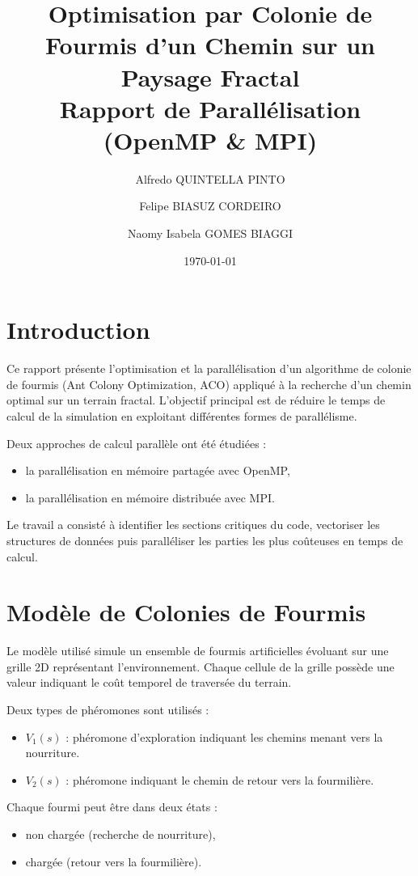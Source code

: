 \documentclass[12pt, a4paper]{article}
\title{\textbf{Optimisation par Colonie de Fourmis d'un Chemin sur un Paysage Fractal} \\ \Large Rapport de Parallélisation (OpenMP \& MPI)}
\author{
    Alfredo QUINTELLA PINTO
    \and
    Felipe BIASUZ CORDEIRO
    \and
    Naomy Isabela GOMES BIAGGI}
\date{\today}
\begin{document}
\maketitle

\section{Introduction}

Ce rapport présente l’optimisation et la parallélisation d’un algorithme de colonie de fourmis (Ant Colony Optimization, ACO) appliqué à la recherche d’un chemin optimal sur un terrain fractal. L’objectif principal est de réduire le temps de calcul de la simulation en exploitant différentes formes de parallélisme.

Deux approches de calcul parallèle ont été étudiées :

\begin{itemize}
\item la parallélisation en mémoire partagée avec OpenMP,
\item la parallélisation en mémoire distribuée avec MPI.
\end{itemize}

Le travail a consisté à identifier les sections critiques du code, vectoriser les structures de données puis paralléliser les parties les plus coûteuses en temps de calcul.

\section{Modèle de Colonies de Fourmis}

Le modèle utilisé simule un ensemble de fourmis artificielles évoluant sur une grille 2D représentant l’environnement. Chaque cellule de la grille possède une valeur indiquant le coût temporel de traversée du terrain.

Deux types de phéromones sont utilisés :

\begin{itemize}
\item $V_1(s)$ : phéromone d’exploration indiquant les chemins menant vers la nourriture.
\item $V_2(s)$ : phéromone indiquant le chemin de retour vers la fourmilière.
\end{itemize}

Chaque fourmi peut être dans deux états :

\begin{itemize}
\item non chargée (recherche de nourriture),
\item chargée (retour vers la fourmilière).
\end{itemize}
\end{document}
